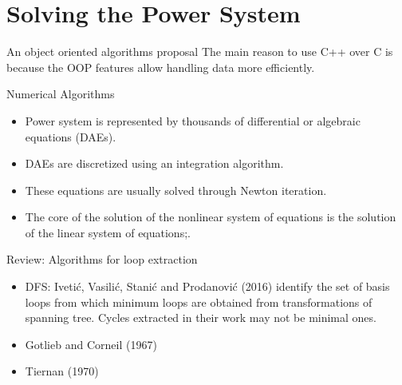 \documentclass[xcolor=dvipsnames]{beamer}
\begin{document}




\section{Solving the Power System}

\begin{frame}{An object oriented algorithms proposal}
	The main reason to use C++ over C is because the OOP features allow handling data more efficiently.
\end{frame}

\begin{frame}{Numerical Algorithms}
	\begin{itemize}
		\item Power system is represented by thousands of differential or algebraic equations (DAEs).
		\item DAEs are discretized using an integration algorithm.
		\item These equations are usually solved through Newton iteration.
		\item The core of the solution of the nonlinear system of equations is the solution of the linear system of equations;. 
	\end{itemize}
\end{frame}

\begin{frame}{Review: Algorithms for loop extraction}
	\begin{itemize}
		\item DFS: Iveti\'c, Vasili\'c, Stani\'c and Prodanovi\'c (2016) identify the set of basis loops from which
		minimum loops are obtained from transformations of spanning tree. Cycles extracted in their work may not 
		be minimal ones.
		\item Gotlieb and Corneil (1967)
		\item Tiernan (1970)
	\end{itemize}
\end{frame}
\end{document}
